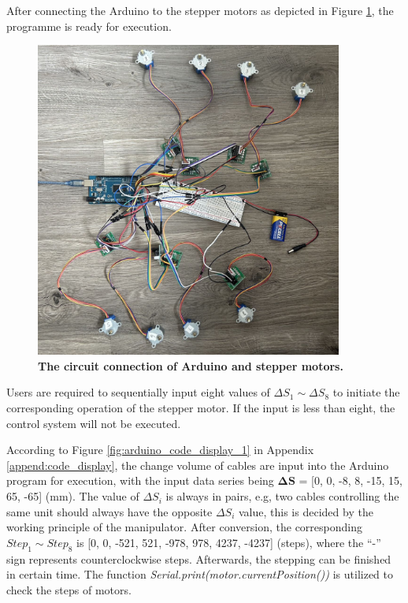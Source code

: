 \vspace{-15mm}

After connecting the Arduino to the stepper motors as depicted in Figure \ref{fig:circuit_connection}, 
the programme is ready for execution.
\begin{figure}[H] %
    \centering 
    \captionsetup{labelsep=colon}
    \includegraphics[width=0.9\textwidth]{Image/Result/circuit_connection.jpg} 
    \caption[The circuit connection of Arduino and stepper motors]
    {\centering \textbf{The circuit connection of Arduino and stepper motors.}}
    \label{fig:circuit_connection}
\end{figure}
\vspace{-5mm}
Users are required to sequentially input eight values of $\Delta S_1 \sim \Delta S_8$ to initiate 
the corresponding operation of the stepper motor. If the input is less than eight, the control system will 
not be executed. 

According to Figure \ref{fig:arduino_code_display_1} in Appendix \ref{append:code_display}, the change volume 
of cables are input into the Arduino program for execution, with the input data series being $\boldsymbol{\Delta S}$ 
= [0, 0, -8, 8, -15, 15, 65, -65] (mm). The value of $\Delta S_i$ is always in pairs, e.g, two cables controlling 
the same unit should always have the opposite $\Delta S_i$ value, this is decided by the working principle of the 
manipulator. After conversion, the corresponding $Step_1 \sim Step_8$ is [0, 0, -521, 521, -978, 978, 4237, -4237] 
(steps), where the “-” sign represents counterclockwise steps. Afterwards, the stepping can be finished in certain 
time. The function \emph{Serial.print(motor.currentPosition())} is utilized to check the steps of motors.

